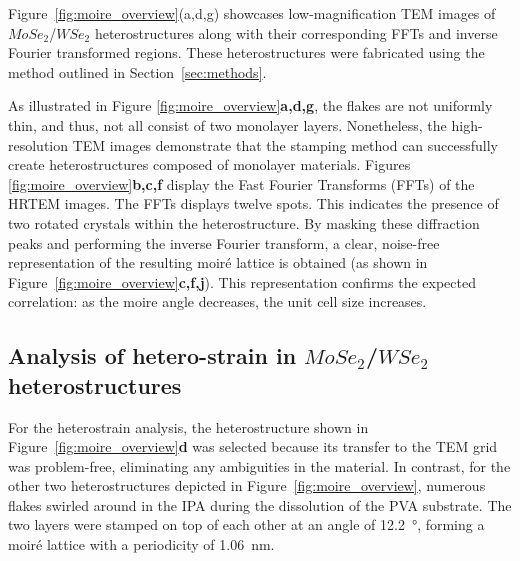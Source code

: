 Figure~\ref{fig:moire_overview}(a,d,g) showcases low-magnification TEM images of $MoSe_2$/$WSe_2$ heterostructures along with their corresponding FFTs and inverse Fourier transformed regions.
%
These heterostructures were fabricated using the method outlined in Section~\ref{sec:methods}. 
%

As illustrated in Figure \ref{fig:moire_overview}\textbf{a,d,g}, the flakes are not uniformly thin, and thus, not all consist of two monolayer layers.
%
Nonetheless, the high-resolution TEM images demonstrate that the stamping method can successfully create heterostructures composed of monolayer materials. 
%
Figures \ref{fig:moire_overview}\textbf{b,c,f} display the Fast Fourier Transforms (FFTs) of the HRTEM images. The FFTs displays twelve spots. This indicates the presence of two rotated crystals within the heterostructure.
%
By masking these diffraction peaks and performing the inverse Fourier transform, a clear, noise-free representation of the resulting moiré lattice is obtained (as shown in Figure~\ref{fig:moire_overview}\textbf{c,f,j}). This representation confirms the expected correlation: as the moire angle decreases, the unit cell size increases. 


\subsection{Analysis of hetero-strain in $MoSe_2$/$WSe_2$ heterostructures}

For the heterostrain analysis, the heterostructure shown in Figure~\ref{fig:moire_overview}\textbf{d} was selected because its transfer to the TEM grid was problem-free, eliminating any ambiguities in the material. In contrast, for the other two heterostructures depicted in Figure~\ref{fig:moire_overview}, numerous flakes swirled around in the IPA during the dissolution of the PVA substrate. The two layers were stamped on top of each other at an angle of \SI{12.2}{\degree}, forming a moiré lattice with a periodicity of \SI{1.06}{\nano\meter}.

